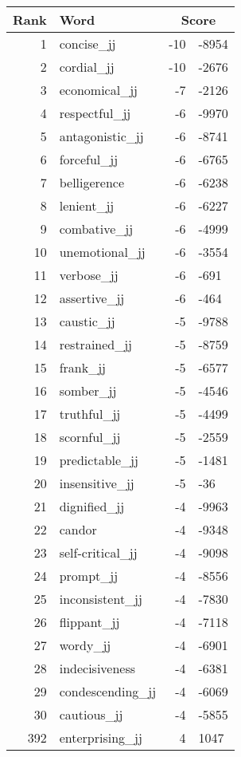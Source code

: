 \begin{longtable}[!htbp]{| rlr@{.}l |}
    \hline
    \textbf{Rank} & \textbf{Word} & \multicolumn{2}{c|}{\textbf{Score}} \\
    \hline
    \endhead
    1 & concise\_jj & -10 & -8954 \\
    2 & cordial\_jj & -10 & -2676 \\
    3 & economical\_jj & -7 & -2126 \\
    4 & respectful\_jj & -6 & -9970 \\
    5 & antagonistic\_jj & -6 & -8741 \\
    6 & forceful\_jj & -6 & -6765 \\
    7 & belligerence & -6 & -6238 \\
    8 & lenient\_jj & -6 & -6227 \\
    9 & combative\_jj & -6 & -4999 \\
    10 & unemotional\_jj & -6 & -3554 \\
    11 & verbose\_jj & -6 & -691 \\
    12 & assertive\_jj & -6 & -464 \\
    13 & caustic\_jj & -5 & -9788 \\
    14 & restrained\_jj & -5 & -8759 \\
    15 & frank\_jj & -5 & -6577 \\
    16 & somber\_jj & -5 & -4546 \\
    17 & truthful\_jj & -5 & -4499 \\
    18 & scornful\_jj & -5 & -2559 \\
    19 & predictable\_jj & -5 & -1481 \\
    20 & insensitive\_jj & -5 & -36 \\
    21 & dignified\_jj & -4 & -9963 \\
    22 & candor & -4 & -9348 \\
    23 & self-critical\_jj & -4 & -9098 \\
    24 & prompt\_jj & -4 & -8556 \\
    25 & inconsistent\_jj & -4 & -7830 \\
    26 & flippant\_jj & -4 & -7118 \\
    27 & wordy\_jj & -4 & -6901 \\
    28 & indecisiveness & -4 & -6381 \\
    29 & condescending\_jj & -4 & -6069 \\
    30 & cautious\_jj & -4 & -5855 \\
    392 & enterprising\_jj & 4 & 1047 \\

\end{longtable}

